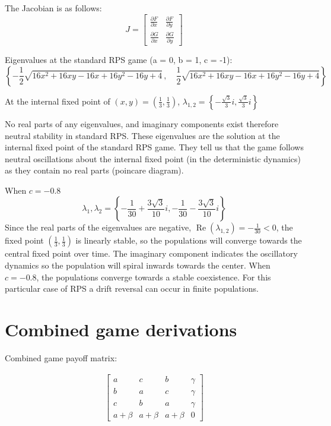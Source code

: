\documentclass{article}
\begin{document}
The Jacobian is as follows:
\[
J = 
\begin{bmatrix}
\frac{\partial F}{\partial x} & \frac{\partial F}{\partial y} \\
\frac{\partial G}{\partial x} & \frac{\partial G}{\partial y}
\end{bmatrix}
\]


Eigenvalues at the standard RPS game (a = 0, b = 1, c = -1):
\[
\left\{
    -\frac{1}{2} \sqrt{16 x^{2} + 16 x y - 16 x + 16 y^{2} - 16 y + 4} \,, \quad
    \frac{1}{2} \sqrt{16 x^{2} + 16 x y - 16 x + 16 y^{2} - 16 y + 4}
\right\}
\]

At the internal fixed point of $(x,y) = (\frac{1}{3}, \frac{1}{3})$, 
$\lambda_{1,2} =\left\{- \frac{\sqrt{3}}{3} i, \frac{\sqrt{3}}{3} i\right\}$

\par
No real parts of any eigenvalues, and imaginary components exist therefore neutral stability in standard RPS.
These eigenvalues are the solution at the internal fixed point of 
the standard RPS game. They tell us that the game follows neutral oscillations
about the internal fixed point (in the deterministic dynamics) as they contain no real parts (poincare diagram).


When $c = -0.8$
\begin{equation}
\lambda_{1}, \lambda_2 = \left\{-\frac{1}{30} + \frac{3 \sqrt{3}}{10}i,
-\frac{1}{30} - \frac{3 \sqrt{3}}{10}i\right\}
\end{equation}
Since the real parts of the eigenvalues are negative, 
$\operatorname{Re}(\lambda_{1,2}) = -\frac{1}{30} < 0$, the fixed point $\left(\frac{1}{3}, \frac{1}{3}\right)$
is linearly stable, so the populations will converge towards the central fixed point over time.
The imaginary component indicates the oscillatory dynamics so the population will spiral inwards 
towards the center. When $c = -0.8$, the populations converge towards a stable
coexistence. For this particular case of RPS a drift reversal can occur in finite populations.


\section{Combined game derivations}


Combined game payoff matrix:

\begin{align}
\label{AugRpsMatrix}
\begin{bmatrix}
    a & c & b & \gamma\\
    b & a & c & \gamma\\
    c & b & a & \gamma\\
    a + \beta & a + \beta & a + \beta & 0
\end{bmatrix}
\end{align}
\end{document}
